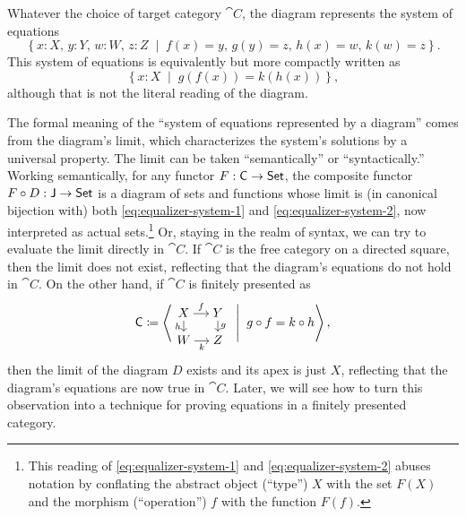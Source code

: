 \documentclass[11pt]{article}
\numberwithin{equation}{section}
\begin{document}
\begin{example}
  Whatever the choice of target category $\cat{C}$, the diagram represents the
  system of equations
  \begin{equation} \label{eq:equalizer-system-1}
    \left\{
      x: X,\, y: Y,\, w: W,\, z: Z
      \;\middle|\;
      f(x) = y,\, g(y) = z,\, h(x) = w,\, k(w) = z
    \right\}.
  \end{equation}
  This system of equations is equivalently but more compactly written as
  \begin{equation} \label{eq:equalizer-system-2}
    \left\{
      x: X
      \;\middle|\;
      g(f(x)) = k(h(x))
    \right\},
  \end{equation}
  although that is not the literal reading of the diagram.

  The formal meaning of the ``system of equations represented by a diagram''
  comes from the diagram's limit, which characterizes the system's solutions by
  a universal property. The limit can be taken ``semantically'' or
  ``syntactically.'' Working semantically, for any functor
  $F: \mathsf{C} \to \mathsf{Set}$, the composite functor $F \circ D: \mathsf{J} \to \mathsf{Set}$ is
  a diagram of sets and functions whose limit is (in canonical bijection with)
  both \eqref{eq:equalizer-system-1} and \eqref{eq:equalizer-system-2}, now
  interpreted as actual sets.\footnote{This reading of
    \eqref{eq:equalizer-system-1} and \eqref{eq:equalizer-system-2} abuses
    notation by conflating the abstract object (``type'') $X$ with the set
    $F(X)$ and the morphism (``operation'') $f$ with the function $F(f)$.} Or,
  staying in the realm of syntax, we can try to evaluate the limit directly in
  $\cat{C}$. If $\cat{C}$ is the free category on a directed square, then the
  limit does not exist, reflecting that the diagram's equations do not hold in
  $\cat{C}$. On the other hand, if $\cat{C}$ is finitely presented as
  \begin{equation*}
    \cat{C} \coloneqq \left\langle
      \begin{tikzcd}[cramped, sep=small]
        X & Y \\
        W & Z
        \arrow["f", from=1-1, to=1-2]
        \arrow["h"', from=1-1, to=2-1]
        \arrow["g", from=1-2, to=2-2]
        \arrow["k"', from=2-1, to=2-2]
      \end{tikzcd}
      \;\Biggm|\;
      g \circ f = k \circ h
      \right\rangle,
  \end{equation*}
  then the limit of the diagram $D$ exists and its apex is just $X$, reflecting
  that the diagram's equations are now true in $\cat{C}$. Later,
  we will see how to turn this observation into a technique for proving
  equations in a finitely presented category.
\end{example}
\end{document}
